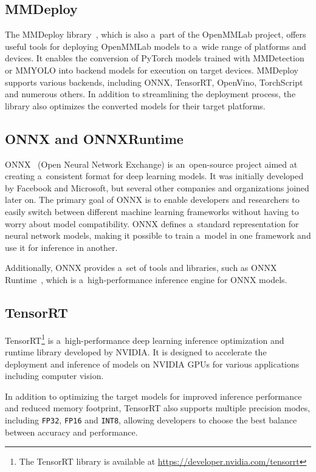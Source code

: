 \subsection{MMDeploy}

The MMDeploy library~\cite{MMDeploy}, which is also a~part of the OpenMMLab project,
offers useful tools for deploying OpenMMLab models to a~wide range of platforms
and devices. It enables the conversion of PyTorch models trained with
MMDetection or MMYOLO into backend models for execution on target devices.
MMDeploy supports various backends, including ONNX, TensorRT, OpenVino,
TorchScript and numerous others. In addition to streamlining the deployment
process, the library also optimizes the converted models for their target
platforms.


\subsection{ONNX and ONNXRuntime}

ONNX~\cite{ONNX} (Open Neural Network Exchange) is an~open-source project aimed
at creating a~consistent format for deep learning models. It was initially
developed by Facebook and Microsoft, but several other companies and
organizations joined later on. The primary goal of ONNX is to enable developers
and researchers to easily switch between different machine learning frameworks
without having to worry about model compatibility. ONNX defines a~standard
representation for neural network models, making it possible to train a~model in
one framework and use it for inference in another.

Additionally, ONNX provides a~set of tools and libraries, such as ONNX
Runtime~\cite{ONNXRuntime}, which is a~high-performance inference engine for
ONNX models.


\subsection{TensorRT}

TensorRT\footnote{The TensorRT library is available at
\url{https://developer.nvidia.com/tensorrt}} is a~high-performance deep learning
inference optimization and runtime library developed by NVIDIA. It is designed
to accelerate the deployment and inference of models on NVIDIA GPUs for various
applications including computer vision.

In addition to optimizing the target models for improved inference
performance and reduced memory footprint, TensorRT also supports multiple
precision modes, including \texttt{FP32}, \texttt{FP16} and \texttt{INT8},
allowing developers to choose the best balance between accuracy and performance.




